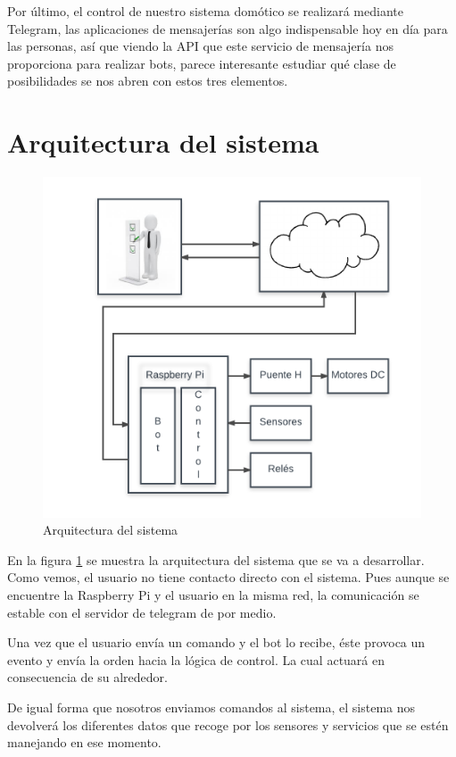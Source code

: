 \documentclass[10pt,journal,compsoc]{IEEEtran}
\begin{document}
Por último, el control de nuestro sistema domótico se realizará mediante Telegram, las aplicaciones 
de mensajerías son algo indispensable hoy en día para las personas, así que viendo la API que este 
servicio de mensajería nos proporciona para realizar bots, parece interesante estudiar qué clase de 
posibilidades se nos abren con estos tres elementos.

\section{Arquitectura del sistema}
\begin{figure}[h]
\centering
\includegraphics[scale=0.5]{ArqSist}
\caption{Arquitectura del sistema}
\label{fig:arqSist}
\end{figure}

En la figura \ref{fig:arqSist} se muestra la arquitectura del sistema que se va a desarrollar. 
Como vemos, el usuario no tiene contacto directo con el sistema. Pues aunque se encuentre la 
Raspberry Pi y el usuario en la misma red, la comunicación se estable con el servidor de telegram 
de por medio.

Una vez que el usuario envía un comando y el bot lo recibe, éste provoca un evento y envía 
la orden hacia la lógica de control. La cual actuará en consecuencia de su alrededor.

De igual forma que nosotros enviamos comandos al sistema, el sistema nos devolverá los diferentes 
datos que recoge por los sensores y servicios que se estén manejando en ese momento.
\end{document}
